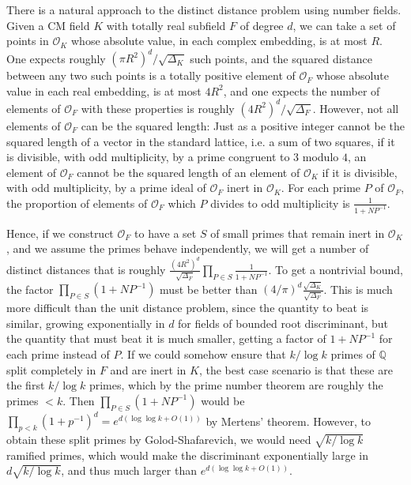 \documentclass[11pt,reqno]{amsart}
\numberwithin{equation}{section}
\theoremstyle{definition}
\theoremstyle{remark}
\begin{document}
There is a natural approach to the distinct distance problem using number fields. Given a CM field $K$ with totally real subfield $F$ of degree $d$, we can take a set of points in $\mathcal O_K$ whose absolute value, in each complex embedding, is at most $R$. One expects roughly $ (\pi R^2)^d / \sqrt{\Delta_K}$ such points, and the squared distance between any two such points is a totally positive element of $\mathcal O_F$ whose absolute value in each real embedding, is at most $4R^2$, and one expects the number of elements of $\mathcal O_F$ with these properties is roughly $(4R^2)^d/ \sqrt{\Delta_F}$. However, not all elements of $\mathcal O_F$ can be the squared length: Just as a positive integer cannot be the squared length of a vector in the standard lattice, i.e. a sum of two squares, if it is divisible, with odd multiplicity, by a prime congruent to $3$ modulo $4$, an element of $\mathcal O_F$ cannot be the squared length of an element of $\mathcal O_K$ if it is divisible, with odd multiplicity, by a prime ideal of $\mathcal O_F$ inert in $\mathcal O_K$. For each prime $P$ of $\mathcal O_F$, the proportion of elements of $\mathcal O_F$ which $P$ divides to odd multiplicity is $\frac{1}{ 1+ NP^{-1}}$.

Hence, if we construct $\mathcal O_F$ to have a set $S$ of small primes that remain inert in $\mathcal O_K$, and we assume the primes behave independently, we will get a number of distinct distances that is roughly $\frac{ (4R^2)^d}{\sqrt{\Delta_F}} \prod_{P \in S} \frac{1}{1+NP^{-1}}$. To get a nontrivial bound, the factor $\prod_{P\in S} (1+ NP^{-1})$ must be better than $(4/\pi)^d \frac{\sqrt{\Delta_K}}{\sqrt{\Delta_F}}$. This is much more difficult than the unit distance problem, since the quantity to beat is similar, growing exponentially in $d$ for fields of bounded root discriminant, but the quantity that must beat it is much smaller, getting a factor of $1+ NP^{-1}$ for each prime instead of $P$. If we could somehow ensure that $k/\log k$ primes of $\mathbb Q$ split completely in $F$ and are inert in $K$, the best case scenario is that these are the first $k/\log k$ primes, which by the prime number theorem are roughly the primes $<k$. Then $\prod_{P\in S} (1+ NP^{-1})$  would be $\prod_{p < k} (1+p^{-1})^d = e^{ d (\log \log k+O(1))}$ by Mertens' theorem. However, to obtain these split primes by Golod-Shafarevich, we would need $\sqrt{k/\log k}$ ramified primes, which would make the discriminant exponentially large in $d \sqrt{k/\log k}$, and thus much larger than $e^{ d (\log \log k+O(1))}$.
\end{document}
